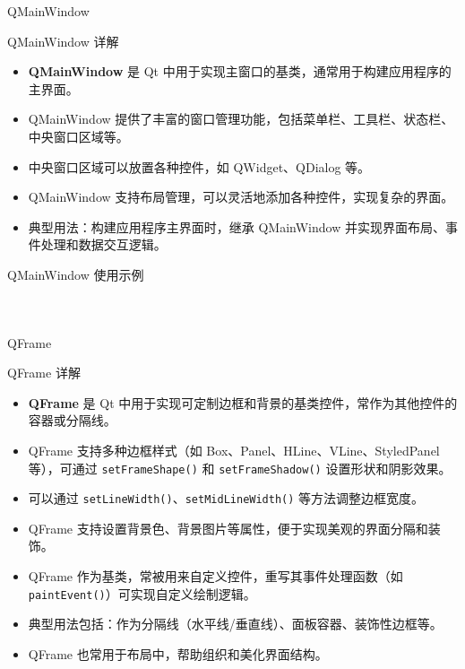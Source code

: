 \documentclass[UTF8,aspectratio=169]{beamer}
\begin{document}
\begin{frame}{QMainWindow}
    \begin{ytublock}{QMainWindow 详解}
        \begin{itemize}
            \item \textbf{QMainWindow} 是 Qt 中用于实现主窗口的基类，通常用于构建应用程序的主界面。
            \item QMainWindow 提供了丰富的窗口管理功能，包括菜单栏、工具栏、状态栏、中央窗口区域等。
            \item 中央窗口区域可以放置各种控件，如 QWidget、QDialog 等。
            \item QMainWindow 支持布局管理，可以灵活地添加各种控件，实现复杂的界面。
            \item 典型用法：构建应用程序主界面时，继承 QMainWindow 并实现界面布局、事件处理和数据交互逻辑。
        \end{itemize}
    \end{ytublock}
\end{frame}

\begin{frame}[fragile]{QMainWindow 使用示例}
    \begin{columns}
        \begin{column}{0.48\textwidth}
            \inputminted[firstline=1,lastline=15]{cpp}{code/qt_mainwindow_example.cpp}
        \end{column}
        \begin{column}{0.48\textwidth}
            \inputminted[firstline=17,lastline=32]{cpp}{code/qt_mainwindow_example.cpp}
        \end{column}
    \end{columns}
\end{frame}

\begin{frame}{QFrame}
    \begin{ytublock}{QFrame 详解}
        \begin{itemize}
            \item \textbf{QFrame} 是 Qt 中用于实现可定制边框和背景的基类控件，常作为其他控件的容器或分隔线。
            \item QFrame 支持多种边框样式（如 Box、Panel、HLine、VLine、StyledPanel 等），可通过 \texttt{setFrameShape()} 和 \texttt{setFrameShadow()} 设置形状和阴影效果。
            \item 可以通过 \texttt{setLineWidth()}、\texttt{setMidLineWidth()} 等方法调整边框宽度。
            \item QFrame 支持设置背景色、背景图片等属性，便于实现美观的界面分隔和装饰。
            \item QFrame 作为基类，常被用来自定义控件，重写其事件处理函数（如 \texttt{paintEvent()}）可实现自定义绘制逻辑。
            \item 典型用法包括：作为分隔线（水平线/垂直线）、面板容器、装饰性边框等。
            \item QFrame 也常用于布局中，帮助组织和美化界面结构。
        \end{itemize}
    \end{ytublock}
\end{frame}
\end{document}
